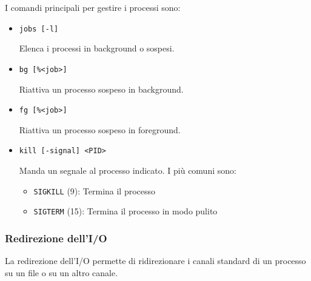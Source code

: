 \documentclass[a4paper]{article}
\begin{document}
\vspace{1em}
\noindent
I comandi principali per gestire i processi sono:
\begin{itemize}
\item 
\begin{lstlisting}
jobs [-l]
\end{lstlisting}
Elenca i processi in background o sospesi.

\item 
\begin{lstlisting}
bg [%<job>]
\end{lstlisting}
Riattiva un processo sospeso in background.

\item 
\begin{lstlisting}
fg [%<job>]
\end{lstlisting}
Riattiva un processo sospeso in foreground.

\item 
\begin{lstlisting}
kill [-signal] <PID>
\end{lstlisting}
Manda un segnale al processo indicato. I più comuni sono:
\begin{itemize}
  \item \texttt{SIGKILL} (9): Termina il processo
  \item \texttt{SIGTERM} (15): Termina il processo in modo pulito
\end{itemize}
\end{itemize}

\subsubsection{Redirezione dell'I/O}
La redirezione dell'I/O permette di ridirezionare i canali standard di un processo su
un file o su un altro canale.
\end{document}
